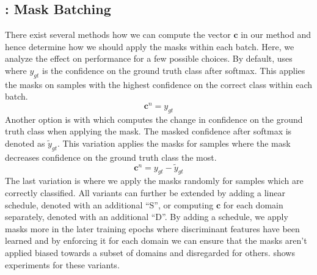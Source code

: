 \subsection{\divcam: Mask Batching}
\label{sec:ablation_study_batching}

There exist several methods how we can compute the vector $\mathbf{c}$ in our method and hence determine how we should apply the masks within each batch. Here, we analyze the effect on performance for a few possible choices. By default, \divcam uses  where $y_{gt}$ is the confidence on the ground truth class after softmax. This applies the masks on samples with the highest confidence on the correct class within each batch.   
\begin{equation}
\label{eq:conf_scamb}
	\mathbf{c}^n = y_{gt}
\end{equation}
Another option is \divcamc with  which computes the change in confidence on the ground truth class when applying the mask. The masked confidence after softmax is denoted as $\tilde{y}_{gt}$. This variation applies the masks for samples where the mask decreases confidence on the ground truth class the most.
\begin{equation}
\label{eq:conf_scamc}
   \mathbf{c}^n = y_{gt} - \tilde{y}_{gt}
\end{equation}
The last variation is \divcamt where we apply the masks randomly for samples which are correctly classified. All variants can further be extended by adding a linear schedule, denoted with an additional ``S'', or computing $\mathbf{c}$ for each domain separately, denoted with an additional ``D''. By adding a schedule, we apply masks more in the later training epochs where discriminant features have been learned and by enforcing it for each domain we can ensure that the masks aren't applied biased towards a subset of domains and disregarded for others.  shows experiments for these variants.


